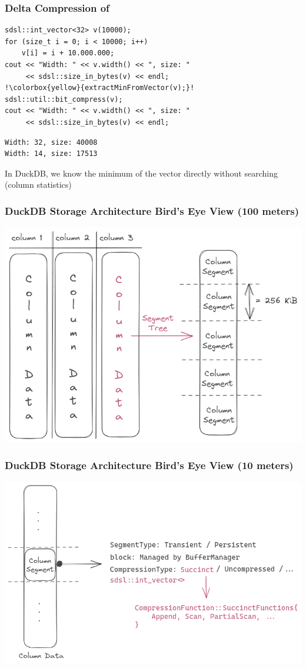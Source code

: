 \documentclass[aspectratio=43]{beamer}
\begin{document}
\begin{frame}[fragile]
    \frametitle{Delta Compression of }
\begin{lstlisting}[style=C++,escapechar=!]
sdsl::int_vector<32> v(10000);
for (size_t i = 0; i < 10000; i++) 
    v[i] = i + 10.000.000;
cout << "Width: " << v.width() << ", size: " 
     << sdsl::size_in_bytes(v) << endl;
!\colorbox{yellow}{extractMinFromVector(v);}!
sdsl::util::bit_compress(v);
cout << "Width: " << v.width() << ", size: " 
     << sdsl::size_in_bytes(v) << endl;
\end{lstlisting}

\begin{lstlisting}[style=shell]
Width: 32, size: 40008
Width: 14, size: 17513
\end{lstlisting}

\pause
In DuckDB, we know the minimum of the vector directly without searching (column statistics)
\end{frame}


\begin{frame}
    \frametitle{DuckDB Storage Architecture Bird's Eye View (100 meters)}
    \includegraphics[width=\framewidth]{figures/excalidraw/duckdb-high-level-storage-arch.png}
\end{frame}


\begin{frame}
    \frametitle{DuckDB Storage Architecture Bird's Eye View (10 meters)}
    \includegraphics[width=\framewidth]{figures/excalidraw/duckdb-column-segment-look.png}
\end{frame}
\end{document}
